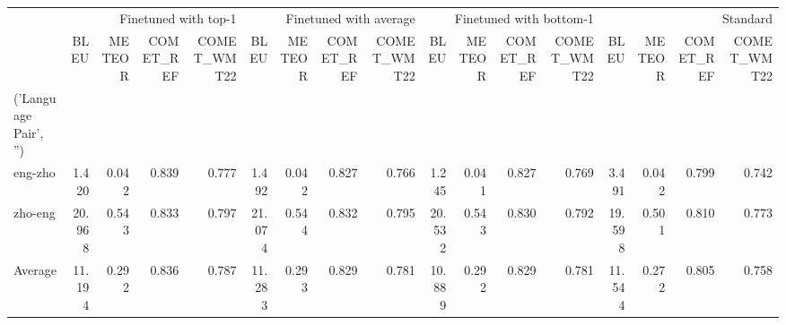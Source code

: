 \begin{tabular}{lrrrrrrrrrrrrrrrr}
\toprule
 & \multicolumn{4}{r}{Finetuned with top-1} & \multicolumn{4}{r}{Finetuned with average} & \multicolumn{4}{r}{Finetuned with bottom-1} & \multicolumn{4}{r}{Standard} \\
 & BLEU & METEOR & COMET_REF & COMET_WMT22 & BLEU & METEOR & COMET_REF & COMET_WMT22 & BLEU & METEOR & COMET_REF & COMET_WMT22 & BLEU & METEOR & COMET_REF & COMET_WMT22 \\
('Language Pair', '') &  &  &  &  &  &  &  &  &  &  &  &  &  &  &  &  \\
\midrule
eng-zho & 1.420 & 0.042 & 0.839 & 0.777 & 1.492 & 0.042 & 0.827 & 0.766 & 1.245 & 0.041 & 0.827 & 0.769 & 3.491 & 0.042 & 0.799 & 0.742 \\
zho-eng & 20.968 & 0.543 & 0.833 & 0.797 & 21.074 & 0.544 & 0.832 & 0.795 & 20.532 & 0.543 & 0.830 & 0.792 & 19.598 & 0.501 & 0.810 & 0.773 \\
Average & 11.194 & 0.292 & 0.836 & 0.787 & 11.283 & 0.293 & 0.829 & 0.781 & 10.889 & 0.292 & 0.829 & 0.781 & 11.544 & 0.272 & 0.805 & 0.758 \\
\bottomrule
\end{tabular}
